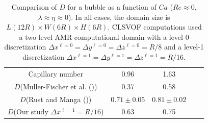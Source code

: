 \documentclass[review]{elsarticle}
\newcommand{\lwh}[3]{L(#1R)\times W(#2R) \times H(#3R)}
\begin{document}
\begin{table}[tbh]
\caption{Comparison of  $D$ for a bubble as a function 
         of $Ca$ ($Re \approx 0$, $\lambda \approx \eta \approx 0$). 
	 In all cases, the domain 
         size is $\lwh{12}{6}{6}$.
         CLSVOF computations used a two-level AMR computational domain 
         with a level-0 discretization $\Delta x^{\ell=0} = \Delta y^{\ell=0} 
         = \Delta z^{\ell=0} = R/8$ and a level-1 discretization
         $\Delta x^{\ell=1} = \Delta y^{\ell=1} = \Delta z^{\ell=1} = R/16$.}

\label{tab:DeComparisonRe=0}
\center
\begin{tabular}{ c  c  c  c  c }
\hline
\hline
Capillary number & 0.96  & 1.63  \\
{$D$}(Muller-Fischer et al. (\cite{MulTobDreFisWin08}))   & 0.37   &   0.58     \\
{$D$}(Rust and Manga (\cite{RusMan02}))    & $0.71\pm 0.05$   &   $0.81\pm 0.02$     \\
{$D$}(Our study $\Delta x^{\ell=1}=R/16$)  & 0.63   &   0.75     \\
\hline
\hline
\end{tabular}
\end{table}
\end{document}
